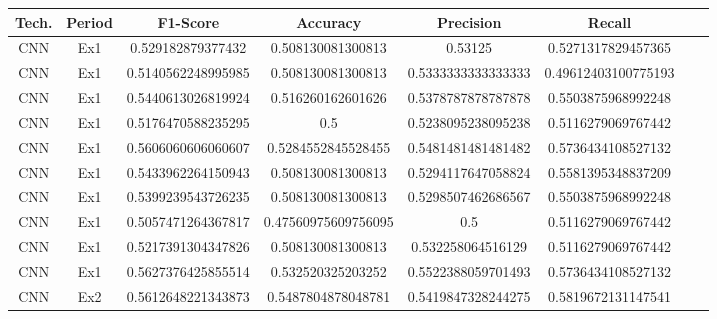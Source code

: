 \begin{appendices}

\thispagestyle{empty}


\renewcommand{\appendixpagename}{Annex}

\label{apendice:a}

%


\begin{table}[H]
\scriptsize
\setlength\extrarowheight{3pt}
\centering
\caption{Resultados categóricos de todos os experimentos para os testes com o CNN. Ações PETR4.SA.}
\begin{longtable}{ccccccll}
\hline
Tech. & Period & F1-Score & Accuracy & Precision & Recall \\ \hline
CNN & Ex1 & 0.529182879377432 & 0.508130081300813 & 0.53125 & 0.5271317829457365 \\
CNN & Ex1 & 0.5140562248995985 & 0.508130081300813 & 0.5333333333333333 & 0.49612403100775193 \\
CNN & Ex1 & 0.5440613026819924 & 0.516260162601626 & 0.5378787878787878 & 0.5503875968992248 \\
CNN & Ex1 & 0.5176470588235295 & 0.5 & 0.5238095238095238 & 0.5116279069767442 \\
CNN & Ex1 & 0.5606060606060607 & 0.5284552845528455 & 0.5481481481481482 & 0.5736434108527132 \\
CNN & Ex1 & 0.5433962264150943 & 0.508130081300813 & 0.5294117647058824 & 0.5581395348837209 \\
CNN & Ex1 & 0.5399239543726235 & 0.508130081300813 & 0.5298507462686567 & 0.5503875968992248 \\
CNN & Ex1 & 0.5057471264367817 & 0.47560975609756095 & 0.5 & 0.5116279069767442 \\
CNN & Ex1 & 0.5217391304347826 & 0.508130081300813 & 0.532258064516129 & 0.5116279069767442 \\
CNN & Ex1 & 0.5627376425855514 & 0.532520325203252 & 0.5522388059701493 & 0.5736434108527132 \\
CNN & Ex2 & 0.5612648221343873 & 0.5487804878048781 & 0.5419847328244275 & 0.5819672131147541 \\

\end{longtable}
\end{table}
\end{appendices}
